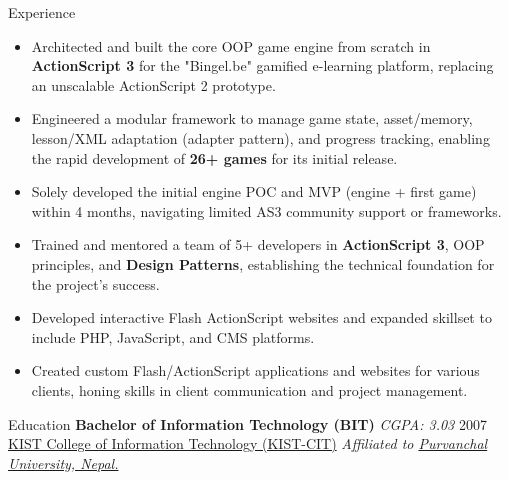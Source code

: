 \documentclass{resume} %
\begin{document}
\begin{rSection}{Experience}
\begin{itemize}
    \item Architected and built the core OOP game engine from scratch in \textbf{ActionScript 3} for the "Bingel.be" gamified e-learning platform, replacing an unscalable ActionScript 2 prototype.
    \item Engineered a modular framework to manage game state, asset/memory, lesson/XML adaptation (adapter pattern), and progress tracking, enabling the rapid development of \textbf{26+ games} for its initial release.
    \item Solely developed the initial engine POC and MVP (engine + first game) within 4 months, navigating limited AS3 community support or frameworks.
    \item Trained and mentored a team of 5+ developers in \textbf{ActionScript 3}, OOP principles, and \textbf{Design Patterns}, establishing the technical foundation for the project's success.
\end{itemize}

\begin{itemize}
    \item Developed interactive Flash ActionScript websites and expanded skillset to include PHP, JavaScript, and CMS platforms.
\end{itemize}

\begin{itemize}
    \item Created custom Flash/ActionScript applications and websites for various clients, honing skills in client communication and project management.
\end{itemize}
\end{rSection} 

\begin{rSection}{Education}
{\bf Bachelor of Information Technology (BIT)} \textit{CGPA: 3.03} \hfill {2007} \\
\href{https://kist.edu.np/program/bit}{KIST College of Information Technology (KIST-CIT)} \hfill {\textit{Affiliated to \href{https://www.purbanchaluniversity.edu.np/}{Purvanchal University, Nepal.}}} \\
\end{rSection}
\end{document}
